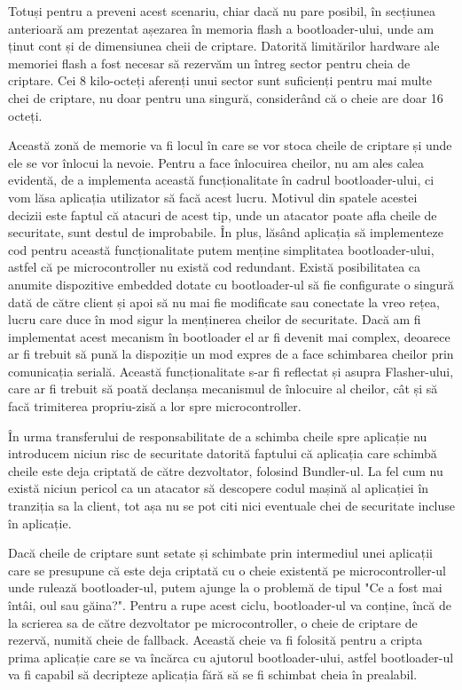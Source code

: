 \documentclass[12pt,a4paper,titlepage]{report}
\begin{document}
Totuși pentru a preveni acest scenariu, chiar dacă nu pare posibil, în secțiunea anterioară am prezentat așezarea în memoria flash a bootloader-ului, unde am ținut cont și de dimensiunea cheii de criptare. Datorită limitărilor hardware ale memoriei flash a fost necesar să rezervăm un întreg sector pentru cheia de criptare. Cei 8 kilo-octeți aferenți unui sector sunt suficienți pentru mai multe chei de criptare, nu doar pentru una singură, considerând că o cheie are doar 16 octeți.

Această zonă de memorie va fi locul în care se vor stoca cheile de criptare și unde ele se vor înlocui la nevoie.
Pentru a face înlocuirea cheilor, nu am ales calea evidentă, de a implementa această funcționalitate în cadrul bootloader-ului, ci vom lăsa aplicația utilizator să facă acest lucru. Motivul din spatele acestei decizii este faptul că atacuri de acest tip, unde un atacator poate afla cheile de securitate, sunt destul de improbabile. În plus, lăsând aplicația să implementeze cod pentru această funcționalitate putem menține simplitatea bootloader-ului, astfel că pe microcontroller nu există cod redundant. Există posibilitatea ca anumite dispozitive embedded dotate cu bootloader-ul să fie configurate o singură dată de către client și apoi să nu mai fie modificate sau conectate la vreo rețea, lucru care duce în mod sigur la menținerea cheilor de securitate. Dacă am fi implementat acest mecanism în bootloader el ar fi devenit mai complex, deoarece ar fi trebuit să pună la dispoziție un mod expres de a face schimbarea cheilor prin comunicația serială. Această funcționalitate s-ar fi reflectat și asupra Flasher-ului, care ar fi trebuit să poată declanșa mecanismul de înlocuire al cheilor, cât și să facă trimiterea propriu-zisă a lor spre microcontroller.

În urma transferului de responsabilitate de a schimba cheile spre aplicație nu introducem niciun risc de securitate datorită faptului că aplicația care schimbă cheile este deja criptată de către dezvoltator, folosind Bundler-ul. La fel cum nu există niciun pericol ca un atacator să descopere codul mașină al aplicației în tranziția sa la client, tot așa nu se pot citi nici eventuale chei de securitate incluse în aplicație.

Dacă cheile de criptare sunt setate și schimbate prin intermediul unei aplicații care se presupune că este deja criptată cu o cheie existentă pe microcontroller-ul unde rulează bootloader-ul, putem ajunge la o problemă de tipul "Ce a fost mai întâi, oul sau găina?". Pentru a rupe acest ciclu, bootloader-ul va conține, încă de la scrierea sa de către dezvoltator pe microcontroller, o cheie de criptare de rezervă, numită cheie de fallback.
Această cheie va fi folosită pentru a cripta prima aplicație care se va încărca cu ajutorul bootloader-ului, astfel bootloader-ul va fi capabil să decripteze aplicația fără să se fi schimbat cheia în prealabil.
\end{document}

